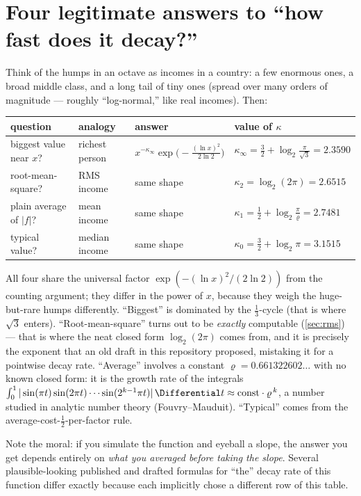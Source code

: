 \documentclass[11pt,oneside]{article}
\theoremstyle{remark}
\begin{document}
\section{Four legitimate answers to ``how fast does it decay?''}
\label{sec:four}

Think of the humps in an octave as incomes in a country: a few
enormous ones, a broad middle class, and a long tail of tiny ones
(spread over many orders of magnitude --- roughly ``log-normal,'' like
real incomes).  Then:

\begin{center}
\begin{tabularx}{\textwidth}{@{}lllX@{}}
\toprule
question & analogy & answer & value of $\kappa$\\
\midrule
biggest value near $x$? & richest person &
$x^{-\kappa_\infty}\exp\bigl(-\tfrac{(\ln x)^2}{2\ln2}\bigr)$ &
$\kappa_\infty=\tfrac32+\log_2\tfrac{\pi}{\sqrt3}=2.3590$\\[0.3em]
root-mean-square? & RMS income &
same shape & $\kappa_2=\log_2(2\pi)=2.6515$\\[0.3em]
plain average of $|f|$? & mean income &
same shape & $\kappa_1=\tfrac12+\log_2\tfrac{\pi}{\varrho}=2.7481$\\[0.3em]
typical value? & median income &
same shape & $\kappa_0=\tfrac32+\log_2\pi=3.1515$\\
\bottomrule
\end{tabularx}
\end{center}

All four share the universal factor
$\exp(-(\ln x)^2/(2\ln2))$ from the counting argument; they differ in
the power of $x$, because they weigh the huge-but-rare humps
differently.  ``Biggest'' is dominated by the $\tfrac13$-cycle
(that is where $\sqrt3$ enters).  ``Root-mean-square'' turns out to be
\emph{exactly} computable (\cref{sec:rms}) --- that is where the neat
closed form $\log_2(2\pi)$ comes from, and it is precisely the
exponent that an old draft in this repository proposed, mistaking it
for a pointwise decay rate.  ``Average'' involves a constant
$\varrho=0.661322602\ldots$ with no known closed form: it is the
growth rate of the integrals
$\int_0^1|\sin(\pi t)\sin(2\pi t)\cdots\sin(2^{k-1}\pi t)|\,\Differential t
\approx\text{const}\cdot\varrho^{\,k}$, a number studied in analytic
number theory (Fouvry--Mauduit).  ``Typical'' comes from the
average-cost-$\tfrac12$-per-factor rule.

Note the moral: if you simulate the function and eyeball a slope, the
answer you get depends entirely on \emph{what you averaged before
taking the slope}.  Several plausible-looking published and drafted
formulas for ``the'' decay rate of this function differ exactly
because each implicitly chose a different row of this table.
\end{document}
